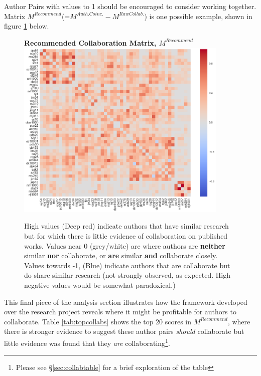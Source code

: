 Author Pairs with values to 1 should be encouraged to consider working together. Matrix $M^{Recommend}$(=$M^{Auth. Coinc.}-M^{Raw Collab.}$) is one possible example, shown in figure \ref{fig:RECOMM_MAT} below.
\newpage
\begin{center}
\begin{figure}[H]
  \centering
  \textbf{Recommended Collaboration Matrix, $M^{Recommend}$}
    \includegraphics[width=0.9\textwidth]{Analysis/Recommending_Mat.png}
    \caption[Recommended Collaboration Matrix]{High values (Deep red) indicate authors that have similar research but for which there is little evidence of collaboration on published works. Values near 0 (grey/white) are where authors are \textbf{neither} similar \textbf{nor} collaborate, or \textbf{are} similar \textbf{and} collaborate closely. Values towards -1, (Blue) indicate authors that are collaborate but do share similar research (not strongly observed, as expected. High negative values would be somewhat paradoxical.) }
    \label{fig:RECOMM_MAT}
\end{figure} 
\end{center}
\newpage
This final piece of the analysis section illustrates how the framework developed over the research project reveals where it might be profitable for authors to collaborate. Table \ref{tab:topcollabs} shows the top 20 scores in $M^{Recommend}$, where there is stronger evidence to suggest these author pairs \emph{should} collaborate but little evidence was found that they \emph{are} collaborating\footnote{Please see \S\ref{sec:collabtable} for a brief exploration of the table}.
